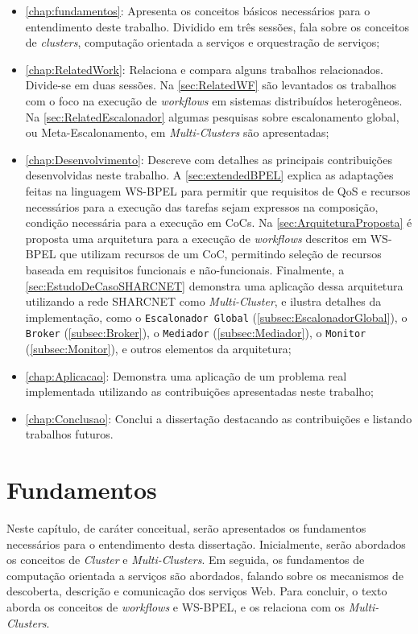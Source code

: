 \documentclass[12pt]{report} %
\begin{document}
	\begin{itemize}
	 \item 	\autoref{chap:fundamentos}: Apresenta os conceitos básicos necessários para o entendimento deste trabalho.
	 Dividido em três sessões, fala sobre os conceitos de \textit{clusters}, computação orientada a serviços e orquestração de serviços;
	 \item 	\autoref{chap:RelatedWork}: Relaciona e compara alguns trabalhos relacionados. Divide-se em duas sessões.
	 Na \autoref{sec:RelatedWF} são levantados os trabalhos com o foco na execução de \textit{workflows} em sistemas distribuídos heterogêneos.
	 Na \autoref{sec:RelatedEscalonador} algumas pesquisas sobre escalonamento global, ou Meta-Escalonamento, em \textit{Multi-Clusters} são apresentadas;
	 \item	\autoref{chap:Desenvolvimento}: Descreve com detalhes as principais contribuições desenvolvidas neste trabalho.
	 A \autoref{sec:extendedBPEL} explica as adaptações feitas na linguagem WS-BPEL para permitir que requisitos de QoS e recursos necessários para a execução das tarefas sejam expressos na composição, condição necessária para a execução em CoCs.
	 Na \autoref{sec:ArquiteturaProposta} é proposta uma arquitetura para a execução de \textit{workflows} descritos em WS-BPEL que utilizam recursos de um CoC, permitindo seleção de recursos baseada em requisitos funcionais e não-funcionais.
	 Finalmente, a \autoref{sec:EstudoDeCasoSHARCNET} demonstra uma aplicação dessa arquitetura utilizando a rede SHARCNET como \textit{Multi-Cluster}, e ilustra detalhes da implementação, como o \texttt{Escalonador Global} (\autoref{subsec:EscalonadorGlobal}), o \texttt{Broker} (\autoref{subsec:Broker}), o \texttt{Mediador} (\autoref{subsec:Mediador}), o \texttt{Monitor} (\autoref{subsec:Monitor}), e outros elementos da arquitetura;
	 \item 	\autoref{chap:Aplicacao}: Demonstra uma aplicação de um problema real implementada utilizando as contribuições apresentadas neste trabalho;
	 \item 	\autoref{chap:Conclusao}: Conclui a dissertação destacando as contribuições e listando trabalhos futuros.
	\end{itemize}    

\chapter{Fundamentos}
\label{chap:fundamentos}    
    Neste capítulo, de caráter conceitual, serão apresentados os fundamentos necessários para o entendimento desta dissertação.
    Inicialmente, serão abordados os conceitos de \textit{Cluster} e \textit{Multi-Clusters}.
    Em seguida, os fundamentos de computação orientada a serviços são abordados, falando sobre os mecanismos de descoberta, descrição e comunicação dos serviços Web.
    Para concluir, o texto aborda os conceitos de \textit{workflows} e WS-BPEL, e os relaciona com os \textit{Multi-Clusters}.
\end{document}

